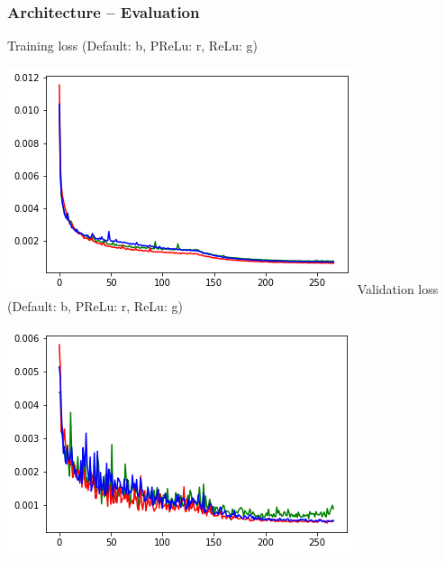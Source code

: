 \clearpage

\begin{frame}
    \frametitle{Architecture -- Evaluation}
    \vspace*{.1cm}
\begin{multicols}{2}
	Training loss (Default: b, PReLu: r, ReLu: g)
	
	\includegraphics[width=.9\columnwidth, height=.6\textheight]{./Ressourcen/Praesentation/Bilder/train_loss.png}%
    \vfill\columnbreak
    Validation loss (Default: b, PReLu: r, ReLu: g)
    
    \includegraphics[width=.9\columnwidth, height=.6\textheight]{./Ressourcen/Praesentation/Bilder/val_loss.png}%
\end{multicols}
    
\end{frame}
\clearpage